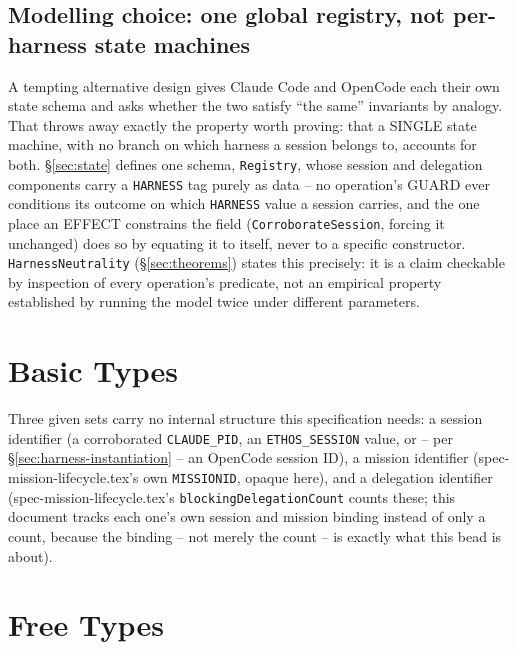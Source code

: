 \documentclass[a4paper,10pt,fleqn]{article}
\newcommand{\field}[1]{\texttt{#1}}
\begin{document}
\subsection{Modelling choice: one global registry, not per-harness
state machines}
\label{sec:modelling-choice}

A tempting alternative design gives Claude Code and OpenCode each their
own state schema and asks whether the two satisfy ``the same''
invariants by analogy. That throws away exactly the property worth
proving: that a SINGLE state machine, with no branch on which harness a
session belongs to, accounts for both. \S\ref{sec:state} defines one
schema, \field{Registry}, whose session and delegation components carry
a \field{HARNESS} tag purely as data -- no operation's GUARD ever
conditions its outcome on which \field{HARNESS} value a session
carries, and the one place an EFFECT constrains the field
(\field{CorroborateSession}, forcing it unchanged) does so by equating
it to itself, never to a specific constructor. \field{HarnessNeutrality}
(\S\ref{sec:theorems}) states this precisely: it is a claim checkable by
inspection of every operation's predicate, not an empirical property
established by running the model twice under different parameters.

\section{Basic Types}
\label{sec:basic}

Three given sets carry no internal structure this specification needs:
a session identifier (a corroborated \field{CLAUDE\_PID}, an
\field{ETHOS\_SESSION} value, or -- per
\S\ref{sec:harness-instantiation} -- an OpenCode session ID), a mission
identifier (spec-mission-lifecycle.tex's own \field{MISSIONID}, opaque
here), and a delegation identifier (spec-mission-lifecycle.tex's
\field{blockingDelegationCount} counts these; this document tracks each
one's own session and mission binding instead of only a count, because
the binding -- not merely the count -- is exactly what this bead is
about).

\begin{zed}
\end{zed}

\section{Free Types}
\label{sec:freetypes}
\end{document}
